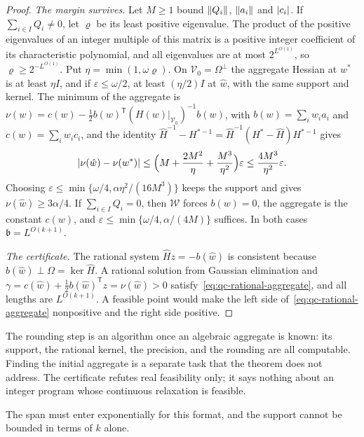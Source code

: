 \begin{proof}
\emph{The margin survives.} Let $M\ge1$ bound $\left\lVert Q_i\right\rVert$, $\left\lVert a_i\right\rVert$ and
$\left\lvert c_i\right\rvert$. If $\sum_{i\in I}Q_i\ne0$, let $\varrho$ be its least positive
eigenvalue. The product of the positive eigenvalues of an integer multiple of
this matrix is a positive integer coefficient of its characteristic
polynomial, and all eigenvalues are at most $2^{L^{O(1)}}$, so
$\varrho\ge2^{-L^{O(1)}}$. Put $\eta=\min(1,\omega\varrho)$. On
$\mathcal V_0=\Omega^\perp$ the aggregate Hessian at $w^*$ is at least $\eta
I$, and if $\varepsilon\le\omega/2$, at least $(\eta/2)I$ at $\hat w$, with the
same support and kernel. The minimum of the aggregate is
$\nu(w)=c(w)-\tfrac12b(w)^{\mathsf T}(H(w)|_{\mathcal V_0})^{-1}b(w)$, with
$b(w)=\sum_iw_ia_i$ and $c(w)=\sum_iw_ic_i$, and the identity
$\hat H^{-1}-H^{*-1}=\hat H^{-1}(H^*-\hat H)H^{*-1}$ gives
\[
\left\lvert\nu(\hat w)-\nu(w^*)\right\rvert\le\Bigl(M+\frac{2M^2}{\eta}+\frac{M^3}{\eta^2}\Bigr)
\varepsilon\le\frac{4M^3}{\eta^2}\varepsilon .
\]
Choosing $\varepsilon\le\min\{\omega/4,\alpha\eta^2/(16M^3)\}$ keeps the
support and gives $\nu(\hat w)\ge3\alpha/4$. If $\sum_{i\in I}Q_i=0$, then
$\mathcal W$ forces $b(w)=0$, the aggregate is the constant $c(w)$, and
$\varepsilon\le\min\{\omega/4,\alpha/(4M)\}$ suffices. In both cases
$\mathfrak b=L^{O(k+1)}$.

\emph{The certificate.} The rational system $\hat Hz=-b(\hat w)$ is
consistent because $b(\hat w)\perp\Omega=\ker\hat H$. A rational solution
from Gaussian elimination and $\gamma=c(\hat w)+\tfrac12b(\hat w)^{\mathsf
T}z=\nu(\hat w)>0$ satisfy~\eqref{eq:qc-rational-aggregate}, and all lengths
are $L^{O(k+1)}$. A feasible point would make the left side
of~\eqref{eq:qc-rational-aggregate} nonpositive and the right side positive.
\end{proof}

The rounding step is an algorithm once an algebraic aggregate is known: its
support, the rational kernel, the precision, and the rounding are all
computable. Finding the initial aggregate is a separate task that the theorem
does not address. The certificate refutes real feasibility only; it says
nothing about an integer program whose continuous relaxation is feasible.

The span must enter exponentially for this format, and the support cannot be
bounded in terms of $k$ alone.

